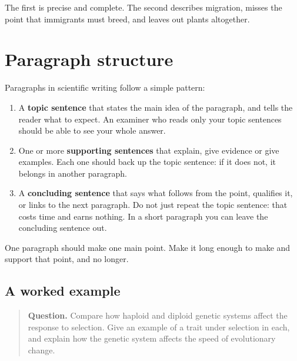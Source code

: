 \documentclass[
  a4paper]{book}
\providecommand{\tightlist}{%
  \setlength{\itemsep}{0pt}\setlength{\parskip}{0pt}}
\begin{document}
The first is precise and complete. The second describes migration, misses the point that immigrants must breed, and leaves out plants altogether.

\section{Paragraph structure}\label{paragraph-structure}

Paragraphs in scientific writing follow a simple pattern:

\begin{enumerate}
\def\labelenumi{\arabic{enumi}.}
\tightlist
\item
  A \textbf{topic sentence} that states the main idea of the paragraph, and tells the reader what to expect. An examiner who reads only your topic sentences should be able to see your whole answer.
\item
  One or more \textbf{supporting sentences} that explain, give evidence or give examples. Each one should back up the topic sentence: if it does not, it belongs in another paragraph.
\item
  A \textbf{concluding sentence} that says what follows from the point, qualifies it, or links to the next paragraph. Do not just repeat the topic sentence: that costs time and earns nothing. In a short paragraph you can leave the concluding sentence out.
\end{enumerate}

One paragraph should make one main point. Make it long enough to make and support that point, and no longer.

\subsection{A worked example}\label{a-worked-example-1}

\begin{quote}
\textbf{Question.} Compare how haploid and diploid genetic systems affect the response to selection. Give an example of a trait under selection in each, and explain how the genetic system affects the speed of evolutionary change.
\end{quote}
\end{document}
